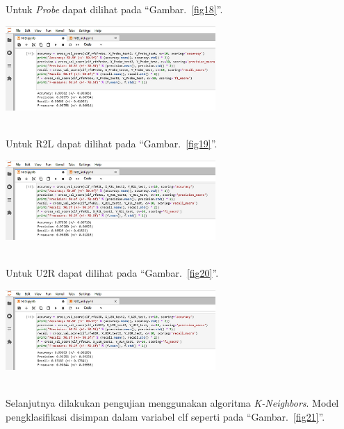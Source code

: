 \documentclass[conference]{IEEEtran}
\begin{document}
\noindent Untuk \emph{Probe} dapat dilihat pada ``Gambar.~\ref{fig18}''.\\

\begin{minipage}{\linewidth}
\centerline{\includegraphics[width=80mm]{Gambar/Gbr17.jpg}}
\label{fig18}
\end{minipage}\\

\noindent Untuk R2L dapat dilihat pada ``Gambar.~\ref{fig19}''.\\

\begin{minipage}{\linewidth}
\centerline{\includegraphics[width=80mm]{Gambar/Gbr18.jpg}}
\label{fig19}
\end{minipage}\\

\noindent Untuk U2R dapat dilihat pada ``Gambar.~\ref{fig20}''.\\

\begin{minipage}{\linewidth}
\centerline{\includegraphics[width=80mm]{Gambar/Gbr19.jpg}}
\label{fig20}
\end{minipage}\\

Selanjutnya dilakukan pengujian menggunakan algoritma \emph{K-Neighbors}. Model pengklasifikasi disimpan dalam variabel clf seperti pada ``Gambar.~\ref{fig21}''.\\
\end{document}
